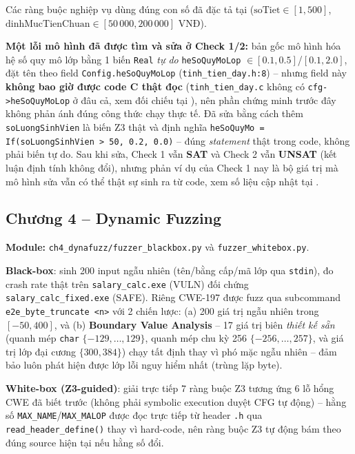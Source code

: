 Các ràng buộc nghiệp vụ dùng đúng con số đã đặc tả tại  ($\text{soTiet}\in[1,500]$, $\text{dinhMucTienChuan}\in[50\,000,200\,000]$ VNĐ).

\textbf{Một lỗi mô hình đã được tìm và sửa ở Check 1/2:} bản gốc mô hình hóa hệ số quy mô lớp bằng 1 biến \texttt{Real} \emph{tự do} \texttt{heSoQuyMoLop} $\in[0.1,0.5]$/$[0.1,2.0]$, đặt tên theo field \texttt{Config.heSoQuyMoLop} (\texttt{tinh\_tien\_day.h:8}) -- nhưng field này \textbf{không bao giờ được code C thật đọc} (\texttt{tinh\_tien\_day.c} không có \texttt{cfg->heSoQuyMoLop} ở đâu cả, xem đối chiếu tại ), nên phần chứng minh trước đây không phản ánh đúng công thức chạy thực tế. Đã sửa bằng cách thêm \texttt{soLuongSinhVien} là biến Z3 thật và định nghĩa \texttt{heSoQuyMo = If(soLuongSinhVien > 50, 0.2, 0.0)} -- đúng \emph{statement} thật trong code, không phải biến tự do. Sau khi sửa, Check 1 vẫn \textbf{SAT} và Check 2 vẫn \textbf{UNSAT} (kết luận định tính không đổi), nhưng phản ví dụ của Check 1 nay là bộ giá trị mà mô hình sửa vẫn có thể thật sự sinh ra từ code, xem số liệu cập nhật tại .

\subsection{Chương 4 -- Dynamic Fuzzing}
\label{sec:ch4}

\textbf{Module:} \texttt{ch4\_dynafuzz/fuzzer\_blackbox.py} và \texttt{fuzzer\_whitebox.py}.

\textbf{Black-box}: sinh 200 input ngẫu nhiên (tên/bằng cấp/mã lớp qua \texttt{stdin}), đo crash rate thật trên \texttt{salary\_calc.exe} (VULN) đối chứng \texttt{salary\_calc\_fixed.exe} (SAFE). Riêng CWE-197 được fuzz qua subcommand \texttt{e2e\_byte\_truncate <n>} với 2 chiến lược: (a) 200 giá trị ngẫu nhiên trong $[-50,400]$, và (b) \textbf{Boundary Value Analysis} -- 17 giá trị biên \emph{thiết kế sẵn} (quanh mép \texttt{char} $\{-129,\dots,129\}$, quanh mép chu kỳ 256 $\{-256,\dots,257\}$, và giá trị lớp đại cương $\{300,384\}$) chạy tất định thay vì phó mặc ngẫu nhiên -- đảm bảo luôn phát hiện được lớp lỗi nguy hiểm nhất (trùng lặp byte).

\textbf{White-box (Z3-guided)}: giải trực tiếp 7 ràng buộc Z3 tương ứng 6 lỗ hổng CWE đã biết trước (không phải symbolic execution duyệt CFG tự động) -- hằng số \texttt{MAX\_NAME}/\texttt{MAX\_MALOP} được đọc trực tiếp từ header \texttt{.h} qua \texttt{read\_header\_define()} thay vì hard-code, nên ràng buộc Z3 tự động bám theo đúng source hiện tại nếu hằng số đổi.

